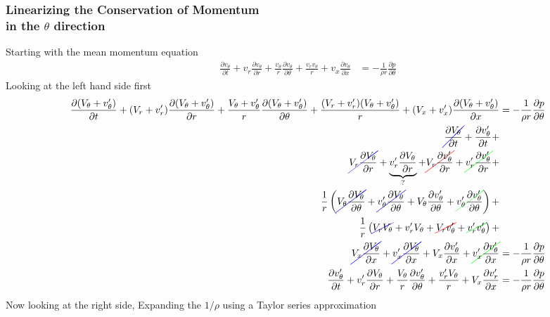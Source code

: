 \subsubsection{Linearizing the Conservation of Momentum\\ in the \textit{$\theta$} direction}
Starting with the mean momentum equation 
\begin{align*}
\frac{\partial v_{\theta}}{\partial t} + 
v_r \frac{\partial v_{\theta}}{\partial r} +
\frac{v_{\theta}  }{r}
\frac{\partial v_{\theta}}{\partial \theta}+
\frac{v_r v_{\theta}}{r}+ 
v_x \frac{\partial v_{\theta}}{\partial x} 
&= -\frac{1}{\rho r} 
\frac{\partial p}{\partial \theta}
\end{align*}
Looking at the left hand side first
\begin{align*} 
\frac{\partial (V_{\theta} + v_{\theta}') }{\partial t} + 
( V_r + v_r' ) 
\frac{\partial( V_{\theta} + v_{\theta}')}{\partial r} +
\frac{V_{\theta} + v_{\theta}'}{r}
\frac{\partial(V_{\theta} + v_{\theta}')}{\partial \theta} +
\frac{ (V_r + v_r')(V_{\theta} + v_{\theta}')}{ r} + 
(V_x + v_x') 
\frac{\partial (V_{\theta} + v_{\theta}')}{\partial x} 	
&= -\frac{1}{\rho r} \frac{\partial p}{\partial \theta}\\
\Ccancel[blue]  {\frac{\partial  V_{\theta}  }{\partial t}}	+
\frac{\partial  v_{\theta}' }{\partial t} + \\
\Ccancel[blue]  {V_r  \frac{\partial  V_{\theta}  }{\partial r}}  +
\underbrace{v_r' \frac{\partial  V_{\theta}  }{\partial r}}_{?} + 
\Ccancel[red]{V_r  \frac{\partial  v_{\theta}' }{\partial r}} + 
\Ccancel[green]{v_r' \frac{\partial  v_{\theta}' }{\partial r}} +\\
\frac{1}{r}
\left(
\Ccancel[blue]  {V_{\theta} \frac{\partial V_{\theta}}{\partial \theta}} +
\Ccancel[blue] {v_{\theta}'\frac{\partial V_{\theta}}{\partial \theta}} +
V_{\theta} \frac{\partial v'_{\theta}}{\partial \theta} +
\Ccancel[green]{v_{\theta}'\frac{\partial v'_{\theta}}{\partial \theta}}
\right)+ \\
\frac{1}{r}\left(
\Ccancel[blue]{V_r V_{\theta}} + 
v_r'V_{\theta} +
\Ccancel[red]{V_r v'_{\theta}}  + 	
\Ccancel[green]{v_r'v_{\theta}'}\right)+\\
\Ccancel[blue]{V_x \frac{\partial V_{\theta} }{\partial x}} +
\Ccancel[blue]{v_x'\frac{\partial V_{\theta} }{\partial x}} +  
V_x \frac{\partial v_{\theta}'}{\partial x} +
\Ccancel[green]{v_x' \frac{\partial v_{\theta}'}{\partial x}} 
&= -\frac{1}{\rho r} 
\frac{\partial p}{\partial \theta}\\
\frac{\partial  v_{\theta}' }{\partial t} +
v_r' \frac{\partial  V_{\theta}  }{\partial r} +
\frac{V_{\theta}}{r} \frac{\partial v'_{\theta}}{\partial \theta} +
\frac{v'_rV_{\theta}}{r} +
V_x \frac{\partial v_r'}{\partial x} 
&= -\frac{1}{\rho r} 
\frac{\partial p}{\partial \theta}
\end{align*}
Now looking at the right side,
Expanding the $1/\rho $ using a Taylor series approximation

